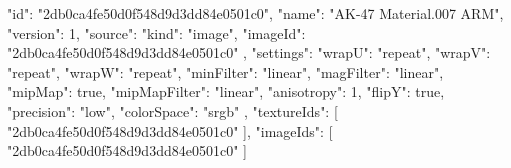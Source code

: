 {
  "id": "2db0ca4fe50d0f548d9d3dd84e0501c0",
  "name": "AK-47 Material.007 ARM",
  "version": 1,
  "source": {
    "kind": "image",
    "imageId": "2db0ca4fe50d0f548d9d3dd84e0501c0"
  },
  "settings": {
    "wrapU": "repeat",
    "wrapV": "repeat",
    "wrapW": "repeat",
    "minFilter": "linear",
    "magFilter": "linear",
    "mipMap": true,
    "mipMapFilter": "linear",
    "anisotropy": 1,
    "flipY": true,
    "precision": "low",
    "colorSpace": "srgb"
  },
  "textureIds": [
    "2db0ca4fe50d0f548d9d3dd84e0501c0"
  ],
  "imageIds": [
    "2db0ca4fe50d0f548d9d3dd84e0501c0"
  ]
}
